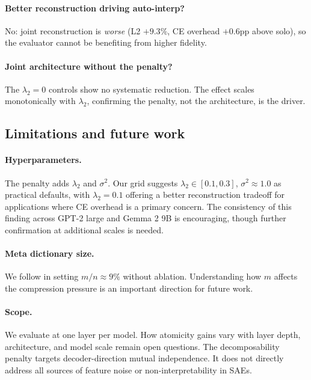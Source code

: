 \documentclass{article} %
\begin{document}
\paragraph{Better reconstruction driving auto-interp?}
No: joint reconstruction is \emph{worse} (L2 $+9.3\%$, CE overhead $+0.6$pp
above solo), so the evaluator cannot be benefiting from higher fidelity.

\paragraph{Joint architecture without the penalty?}
The $\lambda_2 = 0$ controls show no systematic reduction. The effect scales
monotonically with $\lambda_2$, confirming the penalty, not the architecture, is
the driver.


\subsection{Limitations and future work}

\paragraph{Hyperparameters.}
The penalty adds $\lambda_2$ and $\sigma^2$.
Our grid suggests $\lambda_2\!\in\![0.1,0.3]$, $\sigma^2\!\approx\!1.0$ as
practical defaults, with $\lambda_2=0.1$ offering a better reconstruction tradeoff
for applications where CE overhead is a primary concern.
The consistency of this finding across GPT-2 large and Gemma 2 9B is encouraging,
though further confirmation at additional scales is needed.

\paragraph{Meta dictionary size.}
We follow \citet{bussmann2024metasaes} in setting $m/n\!\approx\!9\%$ without
ablation. Understanding how $m$ affects the compression pressure is an important
direction for future work.

\paragraph{Scope.}
We evaluate at one layer per model. How atomicity gains vary with layer
depth, architecture, and model scale remain open questions.
The decomposability penalty targets decoder-direction mutual independence. It does
not directly address all sources of feature noise or non-interpretability in SAEs.
\end{document}
